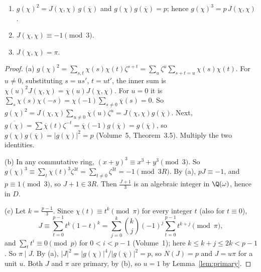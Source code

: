 \begin{lemma}\label{lem:jacobi}
\begin{enumerate}[label=(\alph*)]
\item $g(\chi)^2=J(\chi,\chi)\,g(\overline{\chi})$ and $g(\chi)g(\overline{\chi})=p$; hence $g(\chi)^3=p\,J(\chi,\chi)$.
\item $J(\chi,\chi)\equiv-1\pmod 3$.
\item $J(\chi,\chi)=\pi$.
\end{enumerate}
\end{lemma}
\begin{proof}
(a) $g(\chi)^2=\sum_{s,t}\chi(s)\chi(t)\zeta^{s+t}=\sum_u\zeta^u\sum_{s+t=u}\chi(s)\chi(t)$. For $u\ne0$, substituting $s=us'$, $t=ut'$, the inner sum is
$\chi(u)^2J(\chi,\chi)=\overline{\chi}(u)J(\chi,\chi)$. For $u=0$ it is $\sum_s\chi(s)\chi(-s)=\chi(-1)\sum_{s\ne0}\overline{\chi}(s)=0$. So $g(\chi)^2=J(\chi,\chi)
\sum_{u\ne0}\overline{\chi}(u)\zeta^u=J(\chi,\chi)g(\overline{\chi})$. Next, $\overline{g(\chi)}=\sum\overline{\chi}(t)\zeta^{-t}=\overline{\chi}(-1)g(\overline{\chi})=
g(\overline{\chi})$, so $g(\chi)g(\overline{\chi})=|g(\chi)|^2=p$ (Volume~5, Theorem~3.5). Multiply the two identities.

(b) In any commutative ring, $(x+y)^3\equiv x^3+y^3\pmod3$. So $g(\chi)^3\equiv\sum_t\chi(t)^3\zeta^{3t}=\sum_{t\ne0}\zeta^{3t}=-1\pmod{3R}$. By (a), $pJ\equiv-1$,
and $p\equiv1\pmod3$, so $J+1\in3R$. Then $\frac{J+1}3$ is an algebraic integer in $\Q(\omega)$, hence in $D$.

(c) Let $k=\frac{p-1}3$. Since $\chi(t)\equiv t^k\pmod\pi$ for every integer $t$ (also for $t\equiv0$),
\[
J\equiv\sum_{t=0}^{p-1}t^k(1-t)^k=\sum_{j=0}^k\binom kj(-1)^j\sum_{t=0}^{p-1}t^{k+j}\pmod\pi,
\]
and $\sum_tt^i\equiv0\pmod p$ for $0<i<p-1$ (Volume~1); here $k\le k+j\le2k<p-1$. So $\pi\mid J$. By (a), $|J|^2=|g(\chi)|^4/|g(\overline{\chi})|^2=p$, so
$N(J)=p$ and $J=u\pi$ for a unit $u$. Both $J$ and $\pi$ are primary, by (b), so $u=1$ by Lemma~\ref{lem:primary}.
\end{proof}

